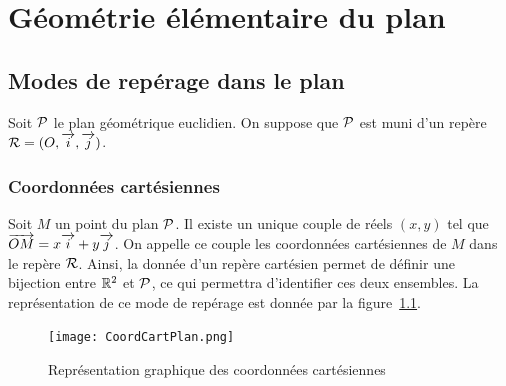 \chapter{Géométrie élémentaire du plan}
\label{chap:geomplan}
\minitoc
\minilof
\minilot
\section{Modes de repérage dans le plan}
\label{sec:modederep}
Soit \(\P\) le plan géométrique euclidien. On suppose que \(\P\) est muni d'un repère \(\Rep=(O,\vi, \vj)\).
%
\subsection{Coordonnées cartésiennes}
\label{subsec:coordcart}
\begin{defdef}
  Soit \(M\) un point du plan \(\P\). Il existe un unique couple de réels \((x,y)\) tel que \(\vect{OM}=x\vi+y\vj\). On appelle ce couple les coordonnées cartésiennes de \(M\) dans le repère \(\Rep\). Ainsi, la donnée d'un repère cartésien permet de définir une bijection entre \(\R^2\) et \(\P\), ce qui permettra d'identifier ces deux ensembles. La représentation de ce mode de repérage est donnée par la figure~\ref{fig:coordcart}.
\end{defdef}
\begin{figure}
  \centering
  \texttt{[image: CoordCartPlan.png]}
  \caption{Représentation graphique des coordonnées cartésiennes}
  \label{fig:coordcart}
\end{figure}
%
